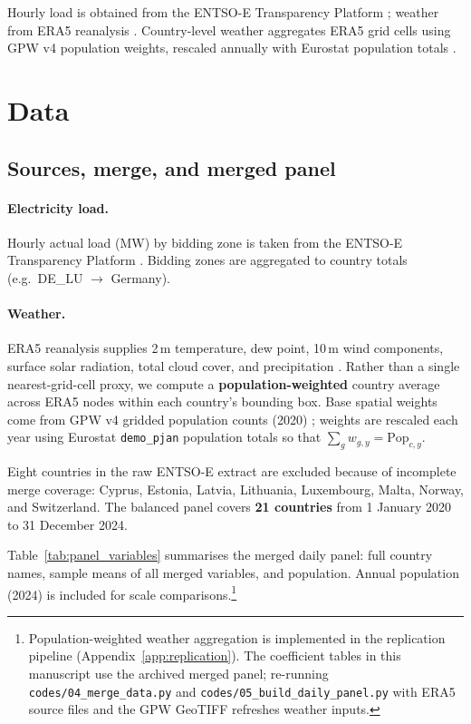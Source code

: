 \documentclass[12pt,a4paper]{article}
\begin{document}
\noindent Hourly load is obtained from the ENTSO-E Transparency Platform \citep{entsoe2024}; weather from ERA5 reanalysis \citep{hersbach2020}. Country-level weather aggregates ERA5 grid cells using GPW v4 population weights, rescaled annually with Eurostat population totals \citep{eurostat2024, gpw2020}.

\section{Data}
\label{sec:data}

\subsection{Sources, merge, and merged panel}

\paragraph{Electricity load.} Hourly actual load (MW) by bidding zone is taken from the ENTSO-E Transparency Platform \citep{entsoe2024}. Bidding zones are aggregated to country totals (e.g.\ DE\_LU $\rightarrow$ Germany).

\paragraph{Weather.} ERA5 reanalysis supplies 2\,m temperature, dew point, 10\,m wind components, surface solar radiation, total cloud cover, and precipitation \citep{hersbach2020}. Rather than a single nearest-grid-cell proxy, we compute a \textbf{population-weighted} country average across ERA5 nodes within each country's bounding box. Base spatial weights come from GPW v4 gridded population counts (2020) \citep{gpw2020}; weights are rescaled each year using Eurostat \texttt{demo\_pjan} population totals \citep{eurostat2024} so that $\sum_g w_{g,y}=\text{Pop}_{c,y}$.

\noindent Eight countries in the raw ENTSO-E extract are excluded because of incomplete merge coverage: Cyprus, Estonia, Latvia, Lithuania, Luxembourg, Malta, Norway, and Switzerland. The balanced panel covers \textbf{21 countries} from 1 January 2020 to 31 December 2024.

\noindent Table~\ref{tab:panel_variables} summarises the merged daily panel: full country names, sample means of all merged variables, and population. Annual population (2024) is included for scale comparisons.\footnote{Population-weighted weather aggregation is implemented in the replication pipeline (Appendix~\ref{app:replication}). The coefficient tables in this manuscript use the archived merged panel; re-running \texttt{codes/04\_merge\_data.py} and \texttt{codes/05\_build\_daily\_panel.py} with ERA5 source files and the GPW GeoTIFF refreshes weather inputs.}
\end{document}
